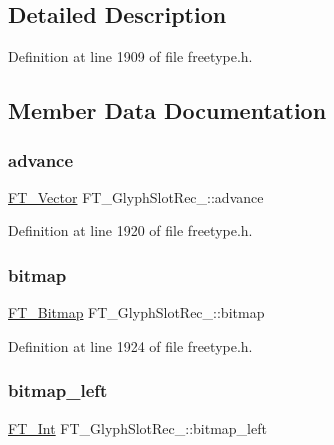 \subsection{Detailed Description}


Definition at line 1909 of file freetype.\+h.



\subsection{Member Data Documentation}
\mbox{\label{struct_f_t___glyph_slot_rec___a09779d1a4781ea029382e92c01048c6a}} 
\subsubsection{\texorpdfstring{advance}{advance}}
{\footnotesize\ttfamily \mbox{\hyperlink{ftimage_8h_ab158b5a7e422acb1968af95db786d018}{F\+T\+\_\+\+Vector}} F\+T\+\_\+\+Glyph\+Slot\+Rec\+\_\+\+::advance}



Definition at line 1920 of file freetype.\+h.

\mbox{\label{struct_f_t___glyph_slot_rec___a8c50199e30b763b8e2a645af04a1f293}} 
\subsubsection{\texorpdfstring{bitmap}{bitmap}}
{\footnotesize\ttfamily \mbox{\hyperlink{ftimage_8h_ae28691030f2d16376937cf5e3485f921}{F\+T\+\_\+\+Bitmap}} F\+T\+\_\+\+Glyph\+Slot\+Rec\+\_\+\+::bitmap}



Definition at line 1924 of file freetype.\+h.

\mbox{\label{struct_f_t___glyph_slot_rec___a7e47f0471336ac68e3c72312a3349dc4}} 
\subsubsection{\texorpdfstring{bitmap\_left}{bitmap\_left}}
{\footnotesize\ttfamily \mbox{\hyperlink{fttypes_8h_af90e5fb0d07e21be9fe6faa33f02484c}{F\+T\+\_\+\+Int}} F\+T\+\_\+\+Glyph\+Slot\+Rec\+\_\+\+::bitmap\+\_\+left}



